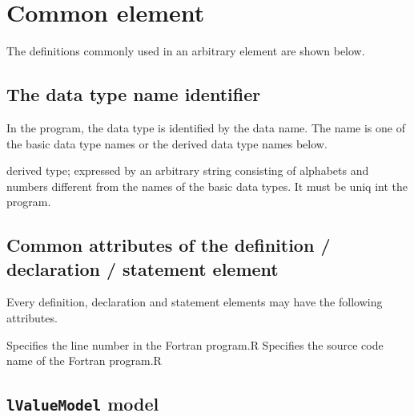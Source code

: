\section{Common element}

The definitions commonly used in an arbitrary element are shown below.

\subsection{The data type name identifier}
\label{sec:Thedatatypenameidentifier}

In the program, the data type is identified by the data name.
The name is one of the basic data type names or the derived data type names below.
\newline

\begin{XcodeMLDataTypeNames}
{derived type; expressed by an arbitrary string consisting of alphabets and numbers
 different from the names of the basic data types. It must be uniq int the program.}
\end{XcodeMLDataTypeNames}


\subsection{Common attributes of the definition / declaration / statement element}
\label{sec:Commonattributesofdefinition}

Every definition, declaration and statement elements may have the following attributes.

\begin{XcodeMLAttributes}
{Specifies the line number in the Fortran program.}{R}
{Specifies the source code name of the Fortran program.}{R}
\end{XcodeMLAttributes}


\subsection{ {\tt lValueModel} model}
\label{sec:lValueModel}

